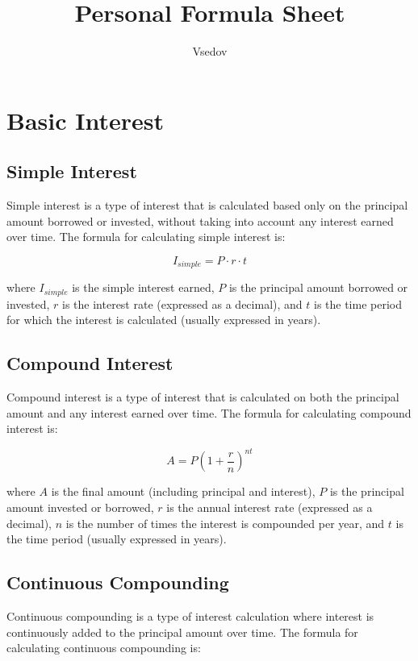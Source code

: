 \documentclass{article}
\title{Personal Formula Sheet}
\author{Vsedov}
\theoremstyle{mytheoremstyle}
\theoremstyle{mytheoremstyle}
\theoremstyle{myproblemstyle}
\begin{document}
    \maketitle
    \tableofcontents

\section{Basic Interest}

\subsection{Simple Interest}
Simple interest is a type of interest that is calculated based only on the principal amount borrowed or invested, without taking into account any interest earned over time. The formula for calculating simple interest is:

\begin{equation}
I_{simple} = P \cdot r \cdot t
\end{equation}

where $I_{simple}$ is the simple interest earned, $P$ is the principal amount borrowed or invested, $r$ is the interest rate (expressed as a decimal), and $t$ is the time period for which the interest is calculated (usually expressed in years).

\subsection{Compound Interest}
Compound interest is a type of interest that is calculated on both the principal amount and any interest earned over time. The formula for calculating compound interest is:

\begin{equation}
A = P \left( 1 + \frac{r}{n} \right) ^{nt}
\end{equation}

where $A$ is the final amount (including principal and interest), $P$ is the principal amount invested or borrowed, $r$ is the annual interest rate (expressed as a decimal), $n$ is the number of times the interest is compounded per year, and $t$ is the time period (usually expressed in years).

\subsection{Continuous Compounding}
Continuous compounding is a type of interest calculation where interest is continuously added to the principal amount over time. The formula for calculating continuous compounding is:
\end{document}
